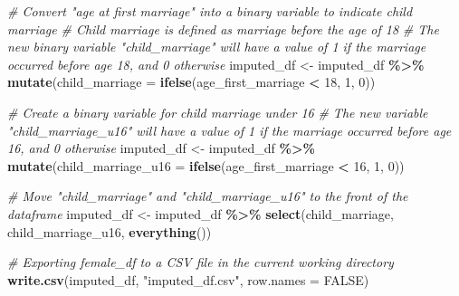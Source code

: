 \documentclass[
]{article}
\newenvironment{Shaded}{\begin{snugshade}}{\end{snugshade}}
\newcommand{\AttributeTok}[1]{\textcolor[rgb]{0.13,0.29,0.53}{#1}}
\newcommand{\CommentTok}[1]{\textcolor[rgb]{0.56,0.35,0.01}{\textit{#1}}}
\newcommand{\ConstantTok}[1]{\textcolor[rgb]{0.56,0.35,0.01}{#1}}
\newcommand{\DecValTok}[1]{\textcolor[rgb]{0.00,0.00,0.81}{#1}}
\newcommand{\FunctionTok}[1]{\textcolor[rgb]{0.13,0.29,0.53}{\textbf{#1}}}
\newcommand{\NormalTok}[1]{#1}
\newcommand{\OtherTok}[1]{\textcolor[rgb]{0.56,0.35,0.01}{#1}}
\newcommand{\SpecialCharTok}[1]{\textcolor[rgb]{0.81,0.36,0.00}{\textbf{#1}}}
\newcommand{\StringTok}[1]{\textcolor[rgb]{0.31,0.60,0.02}{#1}}
\begin{document}
\begin{Shaded}
\begin{Highlighting}[]
\CommentTok{\# Convert "age at first marriage" into a binary variable to indicate child marriage}
\CommentTok{\# Child marriage is defined as marriage before the age of 18}
\CommentTok{\# The new binary variable "child\_marriage" will have a value of 1 if the marriage occurred before age 18, and 0 otherwise}
\NormalTok{imputed\_df }\OtherTok{\textless{}{-}}\NormalTok{ imputed\_df }\SpecialCharTok{\%\textgreater{}\%}
  \FunctionTok{mutate}\NormalTok{(}\AttributeTok{child\_marriage =} \FunctionTok{ifelse}\NormalTok{(age\_first\_marriage }\SpecialCharTok{\textless{}} \DecValTok{18}\NormalTok{, }\DecValTok{1}\NormalTok{, }\DecValTok{0}\NormalTok{))}
\end{Highlighting}
\end{Shaded}

\begin{Shaded}
\begin{Highlighting}[]
\CommentTok{\# Create a binary variable for child marriage under 16}
\CommentTok{\# The new variable "child\_marriage\_u16" will have a value of 1 if the marriage occurred before age 16, and 0 otherwise}
\NormalTok{imputed\_df }\OtherTok{\textless{}{-}}\NormalTok{ imputed\_df }\SpecialCharTok{\%\textgreater{}\%}
  \FunctionTok{mutate}\NormalTok{(}\AttributeTok{child\_marriage\_u16 =} \FunctionTok{ifelse}\NormalTok{(age\_first\_marriage }\SpecialCharTok{\textless{}} \DecValTok{16}\NormalTok{, }\DecValTok{1}\NormalTok{, }\DecValTok{0}\NormalTok{))}
\end{Highlighting}
\end{Shaded}

\begin{Shaded}
\begin{Highlighting}[]
\CommentTok{\# Move "child\_marriage" and "child\_marriage\_u16" to the front of the dataframe}
\NormalTok{imputed\_df }\OtherTok{\textless{}{-}}\NormalTok{ imputed\_df }\SpecialCharTok{\%\textgreater{}\%}
  \FunctionTok{select}\NormalTok{(child\_marriage, child\_marriage\_u16, }\FunctionTok{everything}\NormalTok{())}
\end{Highlighting}
\end{Shaded}

\begin{Shaded}
\begin{Highlighting}[]
\CommentTok{\# Exporting female\_df to a CSV file in the current working directory}
\FunctionTok{write.csv}\NormalTok{(imputed\_df, }\StringTok{"imputed\_df.csv"}\NormalTok{, }\AttributeTok{row.names =} \ConstantTok{FALSE}\NormalTok{)}
\end{Highlighting}
\end{Shaded}
\end{document}
